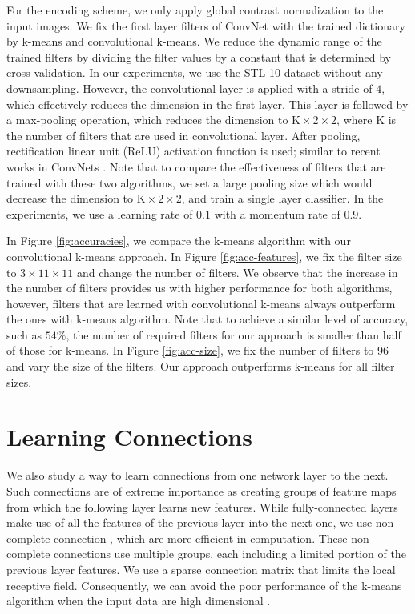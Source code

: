 \documentclass{article} \usepackage{iclr2016_workshop,times}
\begin{document}
For the encoding scheme, we only apply global contrast normalization to the input images. 
We fix the first layer filters of ConvNet with the trained dictionary by k-means and convolutional k-means.
We reduce the dynamic range of the trained filters by dividing the filter values by a constant that is determined by cross-validation.
In our experiments, we use the STL-10 dataset without any downsampling. However, the convolutional layer is applied with a stride of $4$, which effectively reduces the dimension in the first layer.
This layer is followed by a max-pooling operation, which reduces the dimension to $\text{K}\times2\times2$, where K is the number of filters that are used in convolutional layer.
After pooling, rectification linear unit (ReLU) activation function is used;  similar to recent works in ConvNets \citep{krizhevsky2012imagenet}.
Note that to compare the effectiveness of filters that are trained with these two algorithms, 
we set a large pooling size which would decrease the dimension to $\text{K}\times2\times2$, and train a single layer classifier. 
In the experiments, we use a learning rate of $0.1$ with a momentum rate of $0.9$.


In Figure \ref{fig:accuracies}, we compare the k-means algorithm with our convolutional k-means approach. In Figure \ref{fig:acc-features}, we fix the filter size to $3\times11\times11$ and change the number of filters. We observe that the increase in the number of filters provides us with higher performance for both algorithms, however, filters that are learned with convolutional k-means always outperform the ones with k-means algorithm. Note that to achieve a similar level of accuracy, such as $54\%$, the number of required filters for our approach is smaller than half of those for k-means.  
In Figure \ref{fig:acc-size}, we fix the number of filters to $96$ and vary the size of the filters. Our approach outperforms k-means for all filter sizes.



\section{Learning Connections}
\label{sec:connections}


We also study a way to learn connections from one network layer to the next. Such connections are of extreme importance as creating groups of feature maps from which the following layer learns new features.
While fully-connected layers make use of all the features of the previous layer into the next one, we use non-complete connection  \citep{lecun1998gradient}, which are more efficient in computation. These non-complete connections use multiple groups, each including a limited portion of the previous layer features. We use a sparse connection matrix that limits the local receptive field. Consequently, we can avoid the poor performance of the k-means algorithm when the input data are high dimensional \citep{coates2011selecting}.
\end{document}
